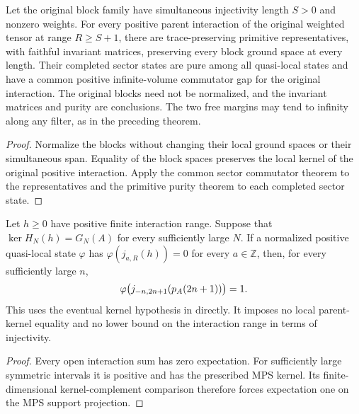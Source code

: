 \begin{lemma}
    \label{thm:original_blocks_pure_sector_commutator_limit_gap}
    \leanok
    Let the original block family have simultaneous injectivity length $S>0$
    and nonzero weights. For every positive parent interaction of the original
    weighted tensor at range $R\geq S+1$, there are trace-preserving primitive
    representatives, with faithful invariant matrices, preserving every
    block ground space at every length. Their completed sector states are
    pure among all quasi-local states and have a common positive
    infinite-volume commutator gap for the original interaction.
    The original blocks need not be normalized, and the invariant matrices
    and purity are conclusions. The two free margins may tend to infinity
    along any filter, as in the preceding theorem.
\end{lemma}
\begin{proof}\leanok
    Normalize the blocks without changing their local ground spaces or their
    simultaneous span. Equality of the block spaces preserves the local
    kernel of the original positive interaction. Apply the common sector
    commutator theorem to the representatives and the primitive purity theorem
    to each completed sector state.
\end{proof}

\begin{lemma}
    \label{thm:quasi_local_zero_energy_support_eventual_kernel}
    \leanok
    Let $h\geq0$ have positive finite interaction range. Suppose that
    $\ker H_N(h)=G_N(A)$ for every sufficiently large $N$.
    If a normalized positive quasi-local state $\varphi$ has
    $\varphi(j_{a,R}(h))=0$ for every $a\in\mathbb Z$, then, for every sufficiently large $n$,
    \begin{align}
        \varphi\bigl(j_{-n,2n+1}(p_A(2n+1))\bigr)=1.
        \notag
    \end{align}
    This uses the eventual kernel hypothesis in
    \cite[Theorem~1.2]{Nachtergaele1996Spectral} directly. It imposes no
    local parent-kernel equality and no lower bound on the interaction
    range in terms of injectivity.
\end{lemma}
\begin{proof}\leanok
    Every open interaction sum has zero expectation. For sufficiently large
    symmetric intervals it is positive and has the prescribed MPS kernel.
    Its finite-dimensional kernel-complement comparison therefore forces
    expectation one on the MPS support projection.
\end{proof}

